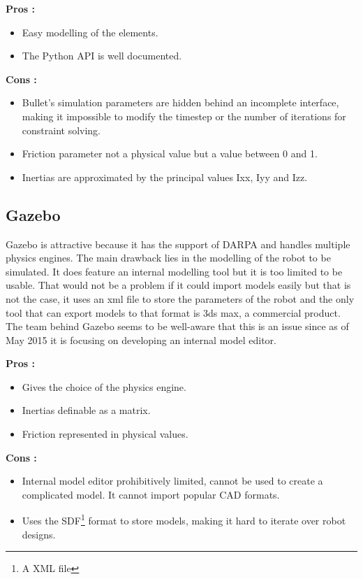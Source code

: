 \textbf{Pros :}
\begin{itemize}
\item Easy modelling of the elements.
\item The Python API is well documented.
\end{itemize}

\textbf{Cons :}
\begin{itemize}
\item Bullet's simulation parameters are hidden behind an incomplete interface, making it impossible to modify the timestep or the number of iterations for constraint solving.
\item Friction parameter not a physical value but a value between 0 and 1.
\item Inertias are approximated by the principal values Ixx, Iyy and Izz.
\end{itemize}

\subsection{Gazebo}
Gazebo is attractive because it has the support of DARPA and handles multiple physics engines. The main drawback lies in the modelling of the robot to be simulated. It does feature an internal modelling tool but it is too limited to be usable. That would not be a problem if it could import models easily but that is not the case, it uses an xml file to store the parameters of the robot and the only tool that can export models to that format is 3ds max, a commercial product. The team behind Gazebo seems to be well-aware that this is an issue since as of May 2015 it is focusing on developing an internal model editor.

\textbf{Pros :}
\begin{itemize}
\item Gives the choice of the physics engine.
\item Inertias definable as a matrix.
\item Friction represented in physical values.
\end{itemize}

\textbf{Cons :}
\begin{itemize}
\item Internal model editor prohibitively limited, cannot be used to create a complicated model. It cannot import popular CAD formats.
\item Uses the SDF\footnote{A XML file} format to store models, making it hard to iterate over robot designs.
\end{itemize}

